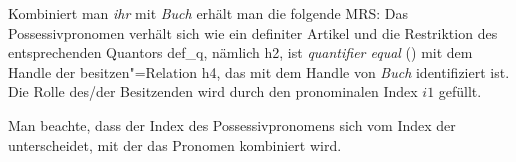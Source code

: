Kombiniert man \emph{ihr} mit \emph{Buch} erhält man die folgende MRS:
\ea
\label{MRS ihr Buch}
\z
Das Possessivpronomen verhält sich wie ein definiter Artikel und die Restriktion des entsprechenden
Quantors def\_q, nämlich h2, ist \emph{quantifier equal} (\qeq) mit dem Handle der besitzen"=Relation h4, das mit dem Handle von
\emph{Buch} identifiziert ist. Die Rolle des/der Besitzenden wird durch den pronominalen Index $i1$ gefüllt.

Man beachte, dass der Index des Possessivpronomens sich vom Index der \nbar unterscheidet, mit der
das Pronomen kombiniert wird.

